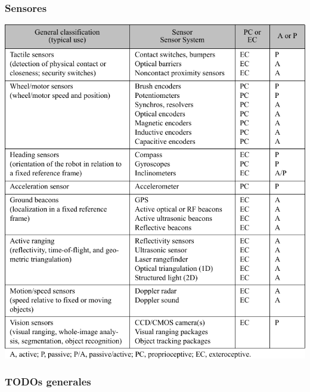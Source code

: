 \begin{frame}
    \frametitle{Sensores}
   
    \centering
    \includegraphics[height=0.9\textheight]{images/sensors_table.pdf} 

\end{frame}



\begin{frame}
    \frametitle{TODOs generales}
\end{frame}



